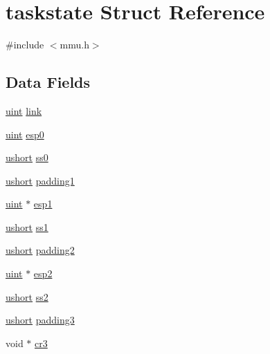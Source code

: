 \hypertarget{structtaskstate}{\section{taskstate Struct Reference}
\label{structtaskstate}
}


{\ttfamily \#include $<$mmu.\-h$>$}

\subsection*{Data Fields}
\begin{DoxyCompactItemize}
\item 
\hyperlink{types_8h_a91ad9478d81a7aaf2593e8d9c3d06a14}{uint} \hyperlink{structtaskstate_ae657c87971475ad47724bbcf3e4537e6}{link}
\item 
\hyperlink{types_8h_a91ad9478d81a7aaf2593e8d9c3d06a14}{uint} \hyperlink{structtaskstate_a105b1107443842b93c88ade5254ab9d2}{esp0}
\item 
\hyperlink{types_8h_ab95f123a6c9bcfee6a343170ef8c5f69}{ushort} \hyperlink{structtaskstate_a9648f5e19cd4adcae28d51f6e326d6f4}{ss0}
\item 
\hyperlink{types_8h_ab95f123a6c9bcfee6a343170ef8c5f69}{ushort} \hyperlink{structtaskstate_af1bf63d9df475699143c50918af7c3b9}{padding1}
\item 
\hyperlink{types_8h_a91ad9478d81a7aaf2593e8d9c3d06a14}{uint} $\ast$ \hyperlink{structtaskstate_acd0d21f790060be5f36be94fed86be0f}{esp1}
\item 
\hyperlink{types_8h_ab95f123a6c9bcfee6a343170ef8c5f69}{ushort} \hyperlink{structtaskstate_afc8f1257b84a23a426b3b5b2794d98df}{ss1}
\item 
\hyperlink{types_8h_ab95f123a6c9bcfee6a343170ef8c5f69}{ushort} \hyperlink{structtaskstate_a352099edda0c7698cf5f352878346448}{padding2}
\item 
\hyperlink{types_8h_a91ad9478d81a7aaf2593e8d9c3d06a14}{uint} $\ast$ \hyperlink{structtaskstate_abfc181b97d3a3bf5afdc662d5d345764}{esp2}
\item 
\hyperlink{types_8h_ab95f123a6c9bcfee6a343170ef8c5f69}{ushort} \hyperlink{structtaskstate_a6a7c092edd3dde61711a7e349e4eb191}{ss2}
\item 
\hyperlink{types_8h_ab95f123a6c9bcfee6a343170ef8c5f69}{ushort} \hyperlink{structtaskstate_a1d1a645b86f97ca1844887d6178675aa}{padding3}
\item 
void $\ast$ \hyperlink{structtaskstate_a915afcdc183379971c3d7f5d665017c6}{cr3}
\item 

\end{DoxyCompactItemize}
